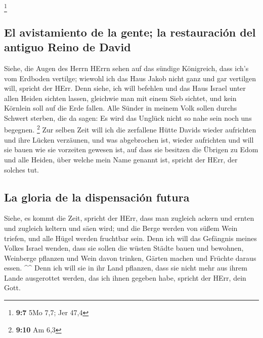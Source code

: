 \footnote{\textbf{9:7} 5Mo 7,7; Jer 47,4}

\hypertarget{el-avistamiento-de-la-gente-la-restauraciuxf3n-del-antiguo-reino-de-david}{%
\subsection{El avistamiento de la gente; la restauración del antiguo
Reino de
David}\label{el-avistamiento-de-la-gente-la-restauraciuxf3n-del-antiguo-reino-de-david}}

 Siehe, die Augen des Herrn HErrn sehen auf das sündige
Königreich, dass ich's vom Erdboden vertilge; wiewohl ich das Haus Jakob
nicht ganz und gar vertilgen will, spricht der HErr.  Denn
siehe, ich will befehlen und das Haus Israel unter allen Heiden sichten
lassen, gleichwie man mit einem Sieb sichtet, und kein Körnlein soll auf
die Erde fallen.  Alle Sünder in meinem Volk sollen
durchs Schwert sterben, die da sagen: Es wird das Unglück nicht so nahe
sein noch uns begegnen. \footnote{\textbf{9:10} Am 6,3} 
Zur selben Zeit will ich die zerfallene Hütte Davids wieder aufrichten
und ihre Lücken verzäunen, und was abgebrochen ist, wieder aufrichten
und will sie bauen wie sie vorzeiten gewesen ist,  auf
dass sie besitzen die Übrigen zu Edom und alle Heiden, über welche mein
Name genannt ist, spricht der HErr, der solches tut.

\hypertarget{la-gloria-de-la-dispensaciuxf3n-futura}{%
\subsection{La gloria de la dispensación
futura}\label{la-gloria-de-la-dispensaciuxf3n-futura}}

 Siehe, es kommt die Zeit, spricht der HErr, dass man
zugleich ackern und ernten und zugleich keltern und säen wird; und die
Berge werden von süßem Wein triefen, und alle Hügel werden fruchtbar
sein.  Denn ich will das Gefängnis meines Volkes Israel
wenden, dass sie sollen die wüsten Städte bauen und bewohnen, Weinberge
pflanzen und Wein davon trinken, Gärten machen und Früchte daraus essen.
\^{}\^{}  Denn ich will sie in ihr Land pflanzen, dass
sie nicht mehr aus ihrem Lande ausgerottet werden, das ich ihnen gegeben
habe, spricht der HErr, dein Gott.
